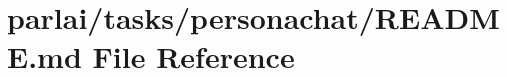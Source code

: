 \hypertarget{parlai_2tasks_2personachat_2README_8md}{}\section{parlai/tasks/personachat/\+R\+E\+A\+D\+ME.md File Reference}
\label{parlai_2tasks_2personachat_2README_8md}
